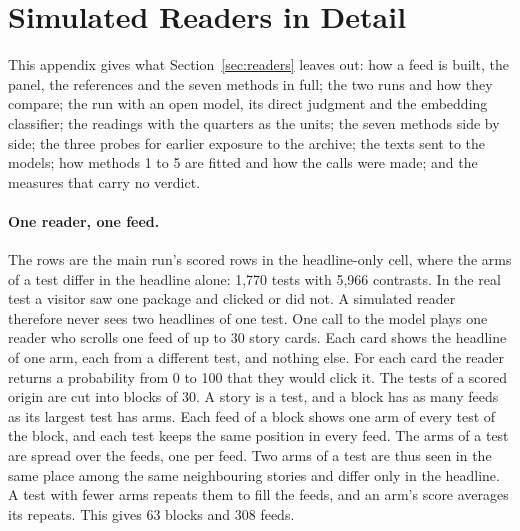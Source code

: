\section{Simulated Readers in Detail}
\label{sec:readers-detail}
This appendix gives what Section~\ref{sec:readers} leaves out: how a feed is built, the panel, the references and the seven methods in full; the two runs and how they compare; the run with an open model, its direct judgment and the embedding classifier; the readings with the quarters as the units; the seven methods side by side; the three probes for earlier exposure to the archive; the texts sent to the models; how methods 1 to 5 are fitted and how the calls were made; and the measures that carry no verdict.

\paragraph{One reader, one feed.} The rows are the main run's scored rows in the headline-only cell, where the arms of a test differ in the headline alone: 1,770 tests with 5,966 contrasts. In the real test a visitor saw one package and clicked or did not. A simulated reader therefore never sees two headlines of one test. One call to the model plays one reader who scrolls one feed of up to 30 story cards. Each card shows the headline of one arm, each from a different test, and nothing else. For each card the reader returns a probability from 0 to 100 that they would click it. The tests of a scored origin are cut into blocks of 30. A story is a test, and a block has as many feeds as its largest test has arms. Each feed of a block shows one arm of every test of the block, and each test keeps the same position in every feed. The arms of a test are spread over the feeds, one per feed. Two arms of a test are thus seen in the same place among the same neighbouring stories and differ only in the headline. A test with fewer arms repeats them to fill the feeds, and an arm's score averages its repeats. This gives 63 blocks and 308 feeds.

